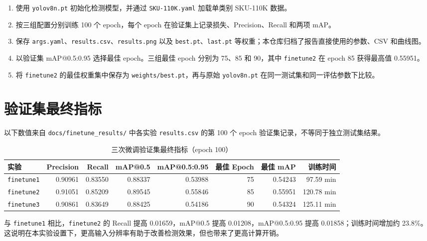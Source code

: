 \documentclass[12pt,a4paper]{ctexart}
\begin{document}
\begin{enumerate}[itemsep=2pt]
    \item 使用 \texttt{yolov8n.pt} 初始化检测模型，并通过 \texttt{SKU-110K.yaml} 加载单类别 SKU-110K 数据。
    \item 按三组配置分别训练 100 个 epoch，每个 epoch 在验证集上记录损失、Precision、Recall 和两项 mAP。
    \item 保存 \texttt{args.yaml}、\texttt{results.csv}、\texttt{results.png} 以及 \texttt{best.pt}、\texttt{last.pt} 等权重；本仓库归档了报告直接使用的参数、CSV 和曲线图。
    \item 以验证集 mAP@0.5:0.95 选择最佳 epoch。三组最佳 epoch 分别为 75、85 和 90，其中 \texttt{finetune2} 在 epoch 85 获得最高值 0.55951。
    \item 将 \texttt{finetune2} 的最佳权重集中保存为 \texttt{weights/best.pt}，再与原始 \texttt{yolov8n.pt} 在同一测试集和同一评估参数下比较。
\end{enumerate}

\section{验证集最终指标}

以下数值来自 \texttt{docs/finetune\_results/} 中各实验 \texttt{results.csv} 的第 100 个 epoch 验证集记录，不等同于独立测试集结果。

\begin{table}[H]
\centering
\caption{三次微调验证集最终指标（epoch 100）}
\small
\setlength{\tabcolsep}{4pt}
\begin{tabular}{lrrrrrrr}
\toprule
\textbf{实验} & \textbf{Precision} & \textbf{Recall} & \textbf{mAP@0.5} & \textbf{mAP@0.5:0.95} & \textbf{最佳 Epoch} & \textbf{最佳 mAP} & \textbf{训练时间} \\
\midrule
\texttt{finetune1} & 0.90961 & 0.83550 & 0.88337 & 0.53988 & 75 & 0.54243 & 97.59 min \\
\texttt{finetune2} & 0.91051 & 0.85209 & 0.89545 & 0.55846 & 85 & 0.55951 & 120.78 min \\
\texttt{finetune3} & 0.90861 & 0.83649 & 0.88425 & 0.54186 & 90 & 0.54324 & 125.11 min \\
\bottomrule
\end{tabular}
\end{table}

与 \texttt{finetune1} 相比，\texttt{finetune2} 的 Recall 提高 0.01659，mAP@0.5 提高 0.01208，mAP@0.5:0.95 提高 0.01858；训练时间增加约 23.8\%。这说明在本实验设置下，更高输入分辨率有助于改善检测效果，但也带来了更高计算开销。
\end{document}
